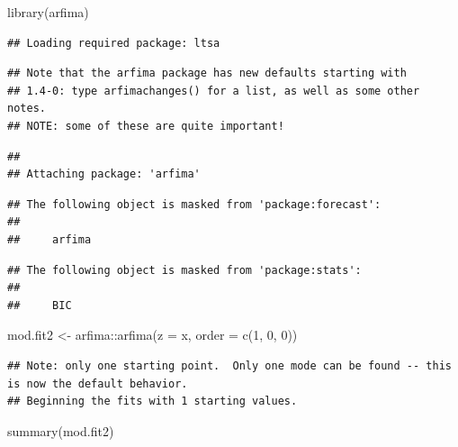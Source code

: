 \documentclass[
]{book}
\newenvironment{Shaded}{\begin{snugshade}}{\end{snugshade}}
\newcommand{\AttributeTok}[1]{\textcolor[rgb]{0.77,0.63,0.00}{#1}}
\newcommand{\DecValTok}[1]{\textcolor[rgb]{0.00,0.00,0.81}{#1}}
\newcommand{\FunctionTok}[1]{\textcolor[rgb]{0.00,0.00,0.00}{#1}}
\newcommand{\NormalTok}[1]{#1}
\newcommand{\OtherTok}[1]{\textcolor[rgb]{0.56,0.35,0.01}{#1}}
\newcommand{\SpecialCharTok}[1]{\textcolor[rgb]{0.00,0.00,0.00}{#1}}
\theoremstyle{definition}
\theoremstyle{definition}
\theoremstyle{definition}
\theoremstyle{definition}
\theoremstyle{remark}
\begin{document}
\begin{Shaded}
\begin{Highlighting}[]
\FunctionTok{library}\NormalTok{(arfima)}
\end{Highlighting}
\end{Shaded}

\begin{verbatim}
## Loading required package: ltsa
\end{verbatim}

\begin{verbatim}
## Note that the arfima package has new defaults starting with
## 1.4-0: type arfimachanges() for a list, as well as some other notes.
## NOTE: some of these are quite important!
\end{verbatim}

\begin{verbatim}
## 
## Attaching package: 'arfima'
\end{verbatim}

\begin{verbatim}
## The following object is masked from 'package:forecast':
## 
##     arfima
\end{verbatim}

\begin{verbatim}
## The following object is masked from 'package:stats':
## 
##     BIC
\end{verbatim}

\begin{Shaded}
\begin{Highlighting}[]
\NormalTok{mod.fit2 }\OtherTok{\textless{}{-}}\NormalTok{ arfima}\SpecialCharTok{::}\FunctionTok{arfima}\NormalTok{(}\AttributeTok{z =}\NormalTok{ x, }\AttributeTok{order =} \FunctionTok{c}\NormalTok{(}\DecValTok{1}\NormalTok{, }\DecValTok{0}\NormalTok{, }\DecValTok{0}\NormalTok{))}
\end{Highlighting}
\end{Shaded}

\begin{verbatim}
## Note: only one starting point.  Only one mode can be found -- this is now the default behavior.
## Beginning the fits with 1 starting values.
\end{verbatim}

\begin{Shaded}
\begin{Highlighting}[]
\FunctionTok{summary}\NormalTok{(mod.fit2)}
\end{Highlighting}
\end{Shaded}
\end{document}
